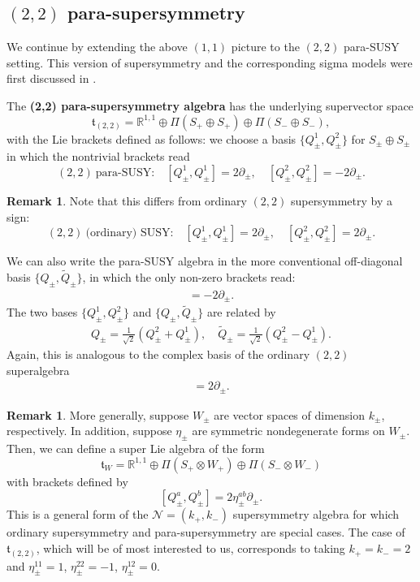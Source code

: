 \documentclass{article}
\newcommand{\RR}{\mathbb{R}}
\newcommand{\cN}{\mathcal{N}}
\newcommand{\p}{\partial}
\newcommand{\wtl}{\widetilde}
\theoremstyle{definition}
\newtheorem{remark}[theorem]{Remark}
\theoremstyle{remark}
\begin{document}
\subsection{$(2,2)$ para-supersymmetry}\label{sec:(2,2)parasusy}
We continue by extending the above $(1,1)$ picture to the $(2,2)$ para-SUSY setting. This version of supersymmetry and the corresponding sigma models were first discussed in \cite{HullTwistedSUSY}.

The {\bf (2,2) para-supersymmetry algebra} has the underlying supervector space
\[
\mathfrak{t}_{(2,2)} = \RR^{1,1} \oplus \Pi(S_+ \oplus S_+) \oplus \Pi(S_- \oplus S_-),
\]
with the Lie brackets defined as follows: we choose a basis $\{Q^1_{\pm}, Q^2_\pm\}$ for $S_\pm \oplus S_\pm$ in which the nontrivial brackets read 
\begin{equation}\label{eq:(2,2)para}
(2,2)\ \text{para-SUSY:}\quad [Q_\pm^1, Q_\pm^1] = 2 \partial_{\pm}, \quad [Q_{\pm}^2, Q_{\pm}^2] = -2 \partial_{\pm} .
\end{equation}

\begin{remark}
Note that this differs from ordinary $(2,2)$ supersymmetry by a sign:
\begin{equation*}
(2,2)\ \text{(ordinary) SUSY:}\quad [Q_\pm^1, Q_\pm^1] = 2 \partial_{\pm}, \quad [Q_{\pm}^2, Q_{\pm}^2] = 2 \partial_{\pm} .
\end{equation*}
\end{remark}

We can also write the para-SUSY algebra in the more conventional off-diagonal basis $\{{Q}_\pm,\wtl{Q}_\pm\}$, in which the only non-zero brackets read:
\begin{align*}
[{Q}_\pm,\wtl{Q}_\pm]=-2\p_\pm.
\end{align*}
The two bases $\{Q^1_{\pm}, Q^2_\pm\}$ and $\{{Q}_\pm,\wtl{Q}_\pm\}$ are related by
\begin{align*}
Q_\pm=\frac{1}{\sqrt{2}}(Q^2_\pm+Q^1_\pm),\quad \wtl{Q}_\pm=\frac{1}{\sqrt{2}}(Q^2_\pm-Q^1_\pm).
\end{align*}
Again, this is analogous to the complex basis of the ordinary $(2,2)$ superalgebra
\begin{align*}
[Q_\pm,\overline{Q}_\pm]=2\p_\pm.
\end{align*}

\begin{remark}

More generally, suppose $W_\pm$ are vector spaces of dimension $k_\pm$, respectively.
In addition, suppose $\eta_\pm$ are symmetric nondegenerate forms on $W_\pm$. 
Then, we can define a super Lie algebra of the form
\[
\mathfrak{t}_{W} =  \RR^{1,1} \oplus \Pi(S_+ \otimes W_+) \oplus \Pi(S_- \otimes W_-)
\]
with brackets defined by
\[
[Q_\pm^{a}, Q_\pm^{b}] = 2 \eta^{ab}_\pm \partial_\pm .
\] 
This is a general form of the $\cN = (k_+, k_-)$ supersymmetry algebra for which ordinary supersymmetry and para-supersymmetry are special cases.
The case of $\mathfrak{t}_{(2,2)}$, which will be of most interested to us, corresponds to taking $k_+ = k_- = 2$ and $\eta_\pm^{11} = 1$, $\eta^{22}_\pm = - 1$, $\eta^{12}_{\pm} = 0$. 

\end{remark}
\end{document}

